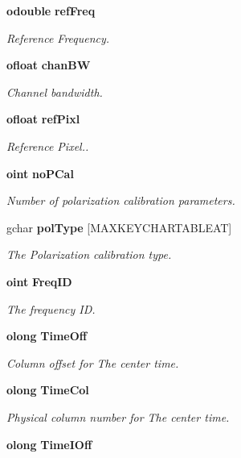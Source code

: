 \begin{CompactItemize}
{\bf odouble} {\bf ref\-Freq}
\begin{CompactList}\small\item\em Reference Frequency. \item\end{CompactList}\item 
{\bf ofloat} {\bf chan\-BW}
\begin{CompactList}\small\item\em Channel bandwidth. \item\end{CompactList}\item 
{\bf ofloat} {\bf ref\-Pixl}
\begin{CompactList}\small\item\em Reference Pixel.. \item\end{CompactList}\item 
{\bf oint} {\bf no\-PCal}
\begin{CompactList}\small\item\em Number of polarization calibration parameters. \item\end{CompactList}\item 
gchar {\bf pol\-Type} [MAXKEYCHARTABLEAT]
\begin{CompactList}\small\item\em The Polarization calibration type. \item\end{CompactList}\item 
{\bf oint} {\bf Freq\-ID}
\begin{CompactList}\small\item\em The frequency ID. \item\end{CompactList}\item 
{\bf olong} {\bf Time\-Off}
\begin{CompactList}\small\item\em Column offset for The center time. \item\end{CompactList}\item 
{\bf olong} {\bf Time\-Col}
\begin{CompactList}\small\item\em Physical column number for The center time. \item\end{CompactList}\item 
{\bf olong} {\bf Time\-IOff}

\end{CompactItemize}
